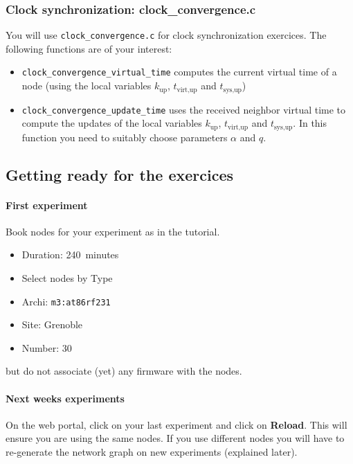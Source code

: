 \documentclass{article}
\begin{document}
\subsubsection{Clock synchronization: clock\_convergence.c}

You will use \verb=clock_convergence.c= for clock synchronization exercices.
The following functions are of your interest:

\begin{itemize}
	\item \verb=clock_convergence_virtual_time= computes the current virtual time of a node
        (using the local variables $k_{\text{up}}$, $t_{\text{virt},\text{up}}$ and $t_{\text{sys},\text{up}}$)
	\item \verb=clock_convergence_update_time= uses the received neighbor virtual time
        to compute the updates of the local variables
        $k_{\text{up}}$, $t_{\text{virt},\text{up}}$ and $t_{\text{sys},\text{up}}$.
        In this function you need to suitably choose parameters $\alpha$ and $q$.
\end{itemize}

\subsection{Getting ready for the exercices}

\paragraph{First experiment} Book nodes for your experiment as in the tutorial.
\begin{itemize}
\item Duration: 240~minutes
\item Select nodes by Type
\item Archi: \texttt{m3:at86rf231}
\item Site: Grenoble
\item Number: $30$
\end{itemize}
but do not associate (yet) any firmware with the nodes.

\paragraph{Next weeks experiments} On the web portal, click on your last
experiment and click on \textbf{Reload}. This will ensure you are using the
same nodes. If you use different nodes you will have to re-generate the network
graph on new experiments (explained later).
\end{document}
